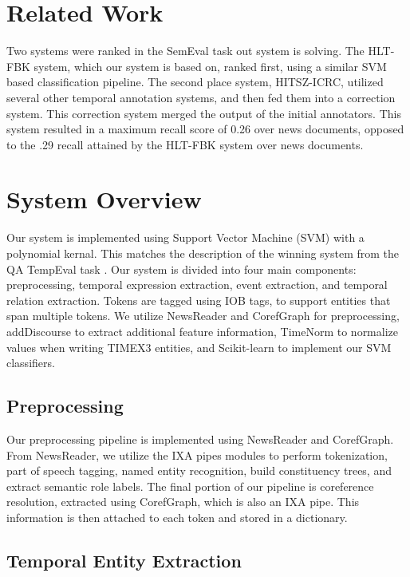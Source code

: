 \documentclass[11pt,letterpaper]{article}
\begin{document}
\section{Related Work}

Two systems were ranked in the SemEval task out system is solving. The HLT-FBK system, which our system is based on, ranked first, using a similar SVM based classification pipeline. The second place system, HITSZ-ICRC, utilized several other temporal annotation systems, and then fed them into a correction system. This correction system merged the output of the initial annotators. This system resulted in a maximum recall score of 0.26 over news documents, opposed to the .29 recall attained by the HLT-FBK system over news documents.

\section{System Overview}

Our system is implemented using Support Vector Machine (SVM) with a polynomial kernal. This matches the description of the winning system from the QA TempEval task \cite{Mirza:15}. Our system is divided into four main components: preprocessing, temporal expression extraction, event extraction, and temporal relation extraction. Tokens are tagged using IOB tags, to support entities that span multiple tokens. We utilize NewsReader and CorefGraph for preprocessing, addDiscourse to extract additional feature information, TimeNorm to normalize values when writing TIMEX3 entities, and Scikit-learn to implement our SVM classifiers.

\subsection{Preprocessing}

Our preprocessing pipeline is implemented using NewsReader and CorefGraph. From NewsReader, we utilize the IXA pipes modules to perform tokenization, part of speech tagging, named entity recognition, build constituency trees, and extract semantic role labels. The final portion of our pipeline is coreference resolution, extracted using CorefGraph, which is also an IXA pipe. This information is then attached to each token and stored in a dictionary.

\subsection{Temporal Entity Extraction}
\end{document}
